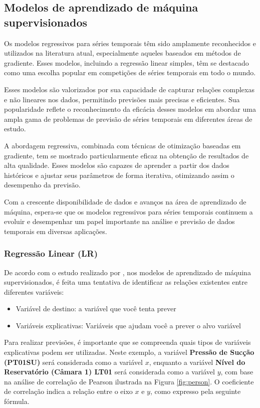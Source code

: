 \subsection{Modelos de aprendizado de m\'aquina supervisionados}\label{subsec:reg}

Os modelos regressivos para séries temporais têm sido amplamente reconhecidos e utilizados na literatura atual, especialmente aqueles baseados em métodos de gradiente. Esses modelos, incluindo a regressão linear simples, têm se destacado como uma escolha popular em competições de séries temporais em todo o mundo.

Esses modelos são valorizados por sua capacidade de capturar relações complexas e não lineares nos dados, permitindo previsões mais precisas e eficientes. Sua popularidade reflete o reconhecimento da eficácia desses modelos em abordar uma ampla gama de problemas de previsão de séries temporais em diferentes áreas de estudo.

A abordagem regressiva, combinada com técnicas de otimização baseadas em gradiente, tem se mostrado particularmente eficaz na obtenção de resultados de alta qualidade. Esses modelos são capazes de aprender a partir dos dados históricos e ajustar seus parâmetros de forma iterativa, otimizando assim o desempenho da previsão.

Com a crescente disponibilidade de dados e avanços na área de aprendizado de máquina, espera-se que os modelos regressivos para séries temporais continuem a evoluir e desempenhar um papel importante na análise e previsão de dados temporais em diversas aplicações.

\subsubsection{Regress\~ao Linear (LR)}

De acordo com o estudo realizado por , nos modelos de aprendizado de máquina supervisionados, é feita uma tentativa de identificar as relações existentes entre diferentes variáveis:


\begin{itemize}
	\item Variável de destino: a variável que você tenta prever
	\item Variáveis explicativas: Variáveis que ajudam você a prever o alvo variável
\end{itemize}

Para realizar previsões, é importante que se compreenda quais tipos de variáveis explicativas podem ser utilizadas. Neste exemplo, a variável \textbf{Pressão de Sucção (PT01SU)} será considerada como a variável $x$, enquanto a variável \textbf{Nível do Reservatório (Câmara 1) LT01} será considerada como a variável $y$, com base na análise de correlação de Pearson ilustrada na Figura \ref{fig:person}. O coeficiente de correlação indica a relação entre o eixo $x$ e $y$, como expresso pela seguinte fórmula.



